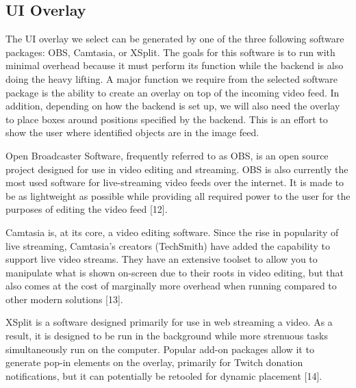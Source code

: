 \documentclass[letterpaper,10pt,onecolumn,draftclsnofoot]{IEEEtran}
\begin{document}
\newpage
\subsection{UI Overlay} %

The UI overlay we select can be generated by one of the three following software packages:  OBS, Camtasia, or XSplit.  The goals for this software is to run with minimal overhead because it must perform its function while the backend is also doing the heavy lifting.  A major function we require from the selected software package is the ability to create an overlay on top of the incoming video feed.  In addition, depending on how the backend is set up, we will also need the overlay to place boxes around positions specified by the backend.  This is an effort to show the user where identified objects are in the image feed.

Open Broadcaster Software, frequently referred to as OBS, is an open source project designed for use in video editing and streaming.  OBS is also currently the most used software for live-streaming video feeds over the internet.  It is made to be as lightweight as possible while providing all required power to the user for the purposes of editing the video feed [12].

Camtasia is, at its core, a video editing software.  Since the rise in popularity of live streaming, Camtasia's creators (TechSmith) have added the capability to support live video streams.  They have an extensive toolset to allow you to manipulate what is shown on-screen due to their roots in video editing, but that also comes at the cost of marginally more overhead when running compared to other modern solutions [13].

XSplit is a software designed primarily  for use in web streaming a video.  As a result, it is designed to be run in the background while more strenuous tasks simultaneously run on the computer.  Popular add-on packages allow it to generate pop-in elements on the overlay, primarily  for Twitch donation notifications, but it can potentially be retooled for dynamic placement [14].
\end{document}
